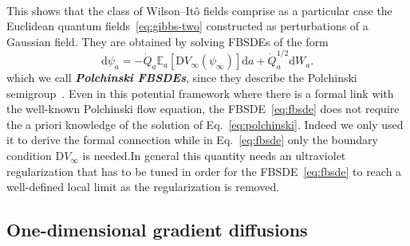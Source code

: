 \documentclass[reprint,aps]{revtex4-2}
\newcommand{\mathD}{\mathrm{D}}
\newcommand{\mathd}{\mathrm{d}}
\newcommand{\tmtextbf}[1]{\textbf{{{#1}}}}
\newcommand{\tmtextit}[1]{\textit{{{#1}}}}
\newcommand{\bbE}{\mathbb{E}}
\begin{document}
\

This shows that the class of Wilson--It{\^o} fields comprise as a particular
case the Euclidean quantum fields~\eqref{eq:gibbs-two} constructed as
perturbations of a Gaussian field. They are obtained by solving FBSDEs of the
form
\begin{equation}
  \mathd \psi_a = - \dot{Q}_a \bbE_a [\mathD V_{\infty} (\psi_{\infty})]
  \mathd a + \dot{Q}_a^{1 / 2} \mathd W_a . \label{eq:fbsde}
\end{equation}
which we call \tmtextbf{\tmtextit{Polchinski FBSDEs}}, since they describe the
Polchinski
semigroup~{\cite{bauerschmidtLogSobolevInequality2021,bauerschmidtStochasticDynamicsPolchinski2023}}.
Even in this potential framework where there is a formal link with the
well-known Polchinski flow equation, the FBSDE~\eqref{eq:fbsde} does not
require the a priori knowledge of the solution of Eq.~\eqref{eq:polchinski}.
Indeed we only used it to derive the formal connection while in
Eq.~\eqref{eq:fbsde} only the boundary condition $\mathD V_{\infty}$ is
needed.\quad In general this quantity needs an ultraviolet regularization that
has to be tuned in order for the FBSDE~\eqref{eq:fbsde} to reach a
well-defined local limit as the regularization is removed.

\subsection{One-dimensional gradient diffusions}
\end{document}
